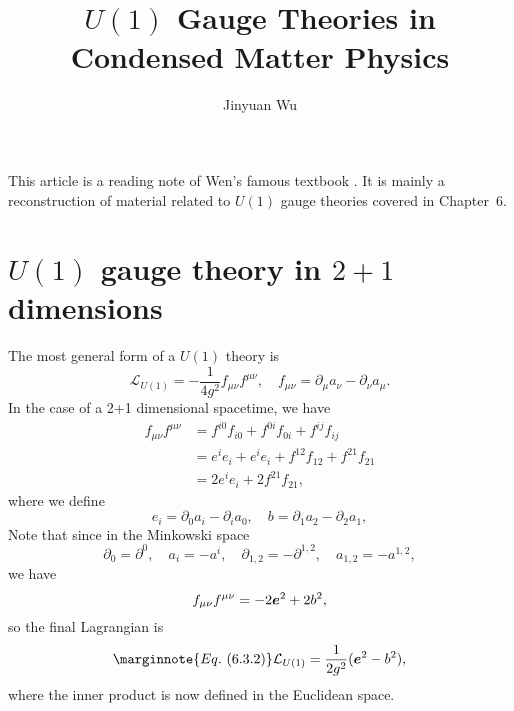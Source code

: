 \documentclass[hyperref, a4paper]{article}
\title{$U(1)$ Gauge Theories in Condensed Matter Physics}
\author{Jinyuan Wu}
\begin{document}
\maketitle

This article is a reading note of Wen's famous textbook \cite{Wen2007}. 
It is mainly a reconstruction of material related to $U(1)$ gauge theories covered in Chapter~6. 

\section{$U(1)$ gauge theory in $2+1$ dimensions}

The most general form of a $U(1)$ theory is 
\begin{equation}
    \mathcal{L}_{U(1)} = - \frac{1}{4 g^2} f_{\mu \nu} f^{\mu \nu}, \quad 
    f_{\mu \nu} = \partial_\mu a_\nu - \partial_\nu a_\mu.
\end{equation}
In the case of a 2+1 dimensional spacetime, we have 
\[
    \begin{aligned}
        f_{\mu \nu} f^{\mu \nu} &= f^{i 0} f_{i 0} + f^{0 i} f_{0 i} + f^{ij} f_{ij} \\
        &= e^i e_i + e^i e_i + f^{12} f_{12} + f^{21} f_{21} \\
        &= 2 e^i e_i + 2 f^{21} f_{21},
    \end{aligned}
\]
where we define 
\begin{equation}
    e_i = \partial_0 a_i - \partial_i a_0, \quad b = \partial_1 a_2 - \partial_2 a_1,
\end{equation}
Note that since in the Minkowski space  
\[
    \partial_0 = \partial^0, \quad a_i = - a^i, \quad \partial_{1,2} = - \partial^{1, 2}, \quad a_{1, 2} = - a^{1, 2},
\]
we have 
\[
    f_{\mu \nu} f^{\mu \nu} = - 2 \vb*{e}^2 + 2 b^2,
\]
so the final Lagrangian is 
\begin{equation} \marginnote{Eq.~(6.3.2)}
    \mathcal{L}_{U(1)} = \frac{1}{2 g^2} (\vb*{e}^2 - b^2),
\end{equation}
where the inner product is now defined in the Euclidean space. 
\end{document}
